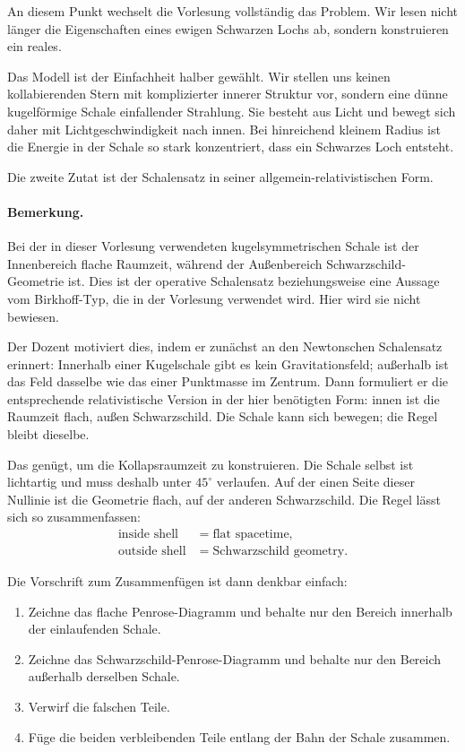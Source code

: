 An diesem Punkt wechselt die Vorlesung vollständig das Problem. Wir lesen nicht länger die Eigenschaften eines ewigen Schwarzen Lochs ab, sondern konstruieren ein reales.

Das Modell ist der Einfachheit halber gewählt. Wir stellen uns keinen kollabierenden Stern mit komplizierter innerer Struktur vor, sondern eine dünne kugelförmige Schale einfallender Strahlung. Sie besteht aus Licht und bewegt sich daher mit Lichtgeschwindigkeit nach innen. Bei hinreichend kleinem Radius ist die Energie in der Schale so stark konzentriert, dass ein Schwarzes Loch entsteht.

Die zweite Zutat ist der Schalensatz in seiner allgemein-relativistischen Form.

\paragraph{Bemerkung.} Bei der in dieser Vorlesung verwendeten kugelsymmetrischen Schale ist der Innenbereich flache Raumzeit, während der Außenbereich Schwarzschild-Geometrie ist. Dies ist der operative Schalensatz beziehungsweise eine Aussage vom Birkhoff-Typ, die in der Vorlesung verwendet wird. Hier wird sie nicht bewiesen.

Der Dozent motiviert dies, indem er zunächst an den Newtonschen Schalensatz erinnert: Innerhalb einer Kugelschale gibt es kein Gravitationsfeld; außerhalb ist das Feld dasselbe wie das einer Punktmasse im Zentrum. Dann formuliert er die entsprechende relativistische Version in der hier benötigten Form: innen ist die Raumzeit flach, außen Schwarzschild. Die Schale kann sich bewegen; die Regel bleibt dieselbe.

Das genügt, um die Kollapsraumzeit zu konstruieren. Die Schale selbst ist lichtartig und muss deshalb unter \(45^\circ\) verlaufen. Auf der einen Seite dieser Nullinie ist die Geometrie flach, auf der anderen Schwarzschild. Die Regel lässt sich so zusammenfassen:
\begin{equation}
\begin{aligned}
\text{inside shell} &= \text{flat spacetime},\\
\text{outside shell} &= \text{Schwarzschild geometry}.
\end{aligned}
\end{equation}

Die Vorschrift zum Zusammenfügen ist dann denkbar einfach:

\begin{enumerate}\item Zeichne das flache Penrose-Diagramm und behalte nur den Bereich innerhalb der einlaufenden Schale.
\item Zeichne das Schwarzschild-Penrose-Diagramm und behalte nur den Bereich außerhalb derselben Schale.
\item Verwirf die falschen Teile.
\item Füge die beiden verbleibenden Teile entlang der Bahn der Schale zusammen.
\end{enumerate}

